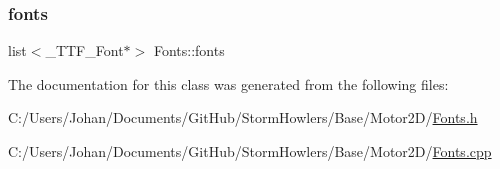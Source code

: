 \subsubsection{\texorpdfstring{fonts}{fonts}}
{\footnotesize\ttfamily list$<$\+\_\+\+T\+T\+F\+\_\+\+Font$\ast$$>$ Fonts\+::fonts}



The documentation for this class was generated from the following files\+:\begin{DoxyCompactItemize}
\item 
C\+:/\+Users/\+Johan/\+Documents/\+Git\+Hub/\+Storm\+Howlers/\+Base/\+Motor2\+D/\mbox{\hyperlink{_fonts_8h}{Fonts.\+h}}\item 
C\+:/\+Users/\+Johan/\+Documents/\+Git\+Hub/\+Storm\+Howlers/\+Base/\+Motor2\+D/\mbox{\hyperlink{_fonts_8cpp}{Fonts.\+cpp}}\end{DoxyCompactItemize}
